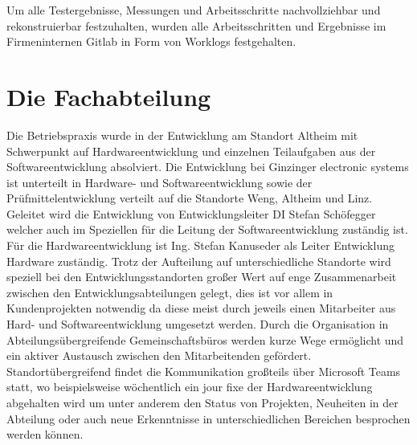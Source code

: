 \documentclass[praktikum,german]{hgbthesis}
\begin{document}
Um alle Testergebnisse, Messungen und Arbeitsschritte nachvollziehbar und rekonstruierbar festzuhalten,
wurden alle Arbeitsschritten und Ergebnisse im Firmeninternen Gitlab in Form von 
Worklogs festgehalten.




\mainmatter           %

\chapter{Die Fachabteilung}




Die Betriebspraxis wurde in der Entwicklung am Standort Altheim mit Schwerpunkt auf Hardwareentwicklung und einzelnen Teilaufgaben aus der Softwareentwicklung absolviert. Die Entwicklung bei Ginzinger electronic systems ist unterteilt in Hardware- und Softwareentwicklung sowie der Prüfmittelentwicklung verteilt auf die Standorte Weng, Altheim und Linz. 
Geleitet wird die Entwicklung von Entwicklungsleiter DI Stefan Schöfegger welcher auch im Speziellen für die Leitung der Softwareentwicklung zuständig ist. Für die Hardwareentwicklung ist Ing. Stefan Kanuseder als Leiter Entwicklung Hardware zuständig. Trotz der Aufteilung auf unterschiedliche Standorte wird speziell bei den Entwicklungsstandorten großer Wert auf enge Zusammenarbeit zwischen den Entwicklungsabteilungen gelegt, dies ist vor allem in Kundenprojekten notwendig da diese meist durch jeweils einen Mitarbeiter aus Hard- und Softwareentwicklung umgesetzt werden. Durch die Organisation in Abteilungsübergreifende Gemeinschaftsbüros werden kurze Wege ermöglicht und ein aktiver Austausch zwischen den Mitarbeitenden gefördert. Standortübergreifend findet die Kommunikation großteils über Microsoft Teams statt, wo beispielsweise wöchentlich ein jour fixe der Hardwareentwicklung abgehalten wird um unter anderem den Status von Projekten, Neuheiten in der Abteilung oder auch neue Erkenntnisse in unterschiedlichen Bereichen besprochen werden können. 
\end{document}
